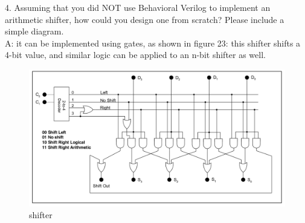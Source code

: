 \documentclass{article}
\begin{document}
4. Assuming that you did NOT use Behavioral Verilog to implement an arithmetic shifter, how could you design one from scratch? Please include a simple diagram.\\
A: it can be implemented using gates, as shown in figure 23: this shifter shifts a 4-bit value, and similar logic can be applied to an n-bit shifter as well. 
\begin{figure}[!htb]
  \centering
  \includegraphics[width=\linewidth]{shifter.png}
  \caption{shifter}
  \label{fig:shift}
\end{figure}
\end{document}
